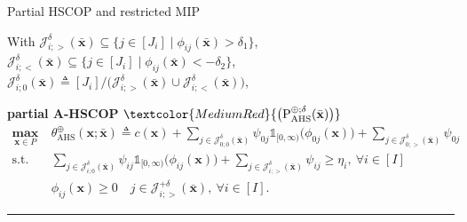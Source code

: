 \documentclass[aspectratio=169,xcolor=dvipsnames]{beamer}
\begin{document}
\begin{frame}{Partial HSCOP and restricted MIP}
  \scriptsize
  \setlength{\abovedisplayskip}{1pt}
  \setlength{\belowdisplayskip}{1pt}

  With $\mathcal{J}^\delta_{i;>}(\bar{\mathbf{x}})\subseteq\{j\in[J_i]\mid
    \phi_{ij}(\bar{\mathbf{x}})>\delta_1\}$,\
  $\mathcal{J}^\delta_{i;<}(\bar{\mathbf{x}})\subseteq\{j\in[J_i]\mid
    \phi_{ij}(\bar{\mathbf{x}})<-\delta_2\}$,\
  $\mathcal{J}^\delta_{i;0}(\bar{\mathbf{x}})\triangleq[J_i]/\bigl(
    \mathcal{J}^\delta_{i;>}(\bar{\mathbf{x}})\cup
    \mathcal{J}^\delta_{i;<}(\bar{\mathbf{x}})\bigr)$,

  \vspace{0.04cm}
  \textcolor{MediumRed}{\textbf{partial A-HSCOP}}
  $\textcolor{MediumRed}{\bigl(\mathrm{P}^{\oplus;\delta}_{\mathrm{AHS}}
    (\bar{\mathbf{x}})\bigr)}$
  \[
    \begin{aligned}
      \operatorname*{\textbf{max}}_{\mathbf{x}\in P}\
      &\theta^{\oplus}_{\mathrm{AHS}}(\mathbf{x};\bar{\mathbf{x}})\triangleq
        c(\mathbf{x})
        +\sum_{j\in\mathcal{J}^\delta_{0;0}(\bar{\mathbf{x}})}\psi_{0j}
          \mathds{1}_{[0,\infty)}\bigl(\phi_{0j}(\mathbf{x})\bigr)
        +\sum_{j\in\mathcal{J}^\delta_{0;>}(\bar{\mathbf{x}})}\psi_{0j}\\
      \text{s.t.}\
      &\sum_{j\in\mathcal{J}^\delta_{i;0}(\bar{\mathbf{x}})}\psi_{ij}
          \mathds{1}_{[0,\infty)}\bigl(\phi_{ij}(\mathbf{x})\bigr)
        +\sum_{j\in\mathcal{J}^\delta_{i;>}(\bar{\mathbf{x}})}\psi_{ij}
        \geq\eta_i,\ \forall i\in[I]\\
      &\phi_{ij}(\mathbf{x})\geq 0\quad
        j\in\mathcal{J}^{+\delta}_{i;>}(\bar{\mathbf{x}}),\ \forall i\in[I].
    \end{aligned}
  \]

  \vspace{-0.14cm}
  {\color{MediumBlack}\rule{\linewidth}{0.4pt}}


\end{frame}
\end{document}
